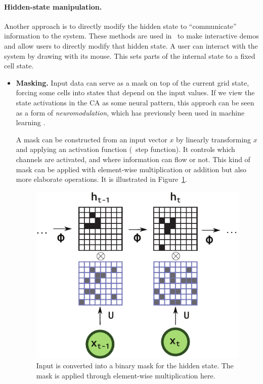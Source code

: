 \paragraph{Hidden-state manipulation.}
Another approach is to directly modify the hidden state to ``communicate''
information to the system. These methods are used
in~\parencite{mordvintsevGrowingNeuralCellular2020,
  randazzoSelfclassifyingMNISTDigits2020} to make interactive demos and allow
users to directly modify that hidden state. A user can interact with the system
by drawing with its mouse. This sets parts of the internal state to a fixed cell
state.

\begin{itemize}
  \item \textbf{Masking.} Input data can serve as a mask on top of the current
        grid state, forcing some cells into states that depend on the input
        values. If we view the state activations in the CA as some neural
        pattern, this approch can be seen as a form of \emph{neuromodulation},
        which has previously been used in machine learning
        \parencite{soltoggioEvolutionaryAdvantagesNeuromodulated2008,
        ishiguroNeuromodulatedControlBipedal2003,
        beaulieuLearningContinuallyLearn2020}.

        A mask can be constructed from an input vector $x$ by linearly
        transforming $x$ and applying an activation function (\eg~step
        function). It controls which channels are activated, and where
        information can flow or not. This kind of mask can be applied with
        element-wise multiplication or addition but also more elaborate
        operations. It is illustrated in Figure~\ref{fig:mask}.

\begin{figure}[ht]
  \centering
  \includegraphics[width=.5\linewidth]{figures/mask.pdf}
  \caption{\label{fig:mask} Input is converted into a binary mask for the hidden
    state. The mask is applied through element-wise multiplication here.}
\end{figure}

\end{itemize}

